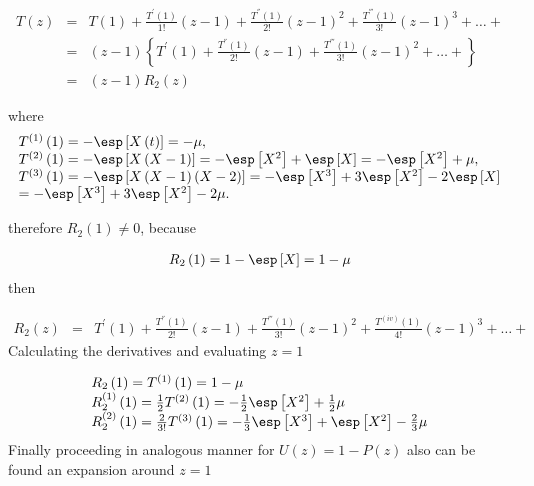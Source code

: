 \begin{eqnarray*}
T\left(z\right)&=&T\left(1\right)+\frac{T^{'}\left(1\right)}{1!}\left(z-1\right)+\frac{T^{''}\left(1\right)}{2!}\left(z-1\right)^{2}+\frac{T^{'''}\left(1\right)}{3!}\left(z-1\right)^{3}+\ldots+\\
&=&\left(z-1\right)\left\{T^{'}\left(1\right)+\frac{T^{''}\left(1\right)}{2!}\left(z-1\right)+\frac{T^{'''}\left(1\right)}{3!}\left(z-1\right)^{2}+\ldots+\right\}\\
&=&\left(z-1\right)R_{2}\left(z\right)
\end{eqnarray*}

where
\begin{eqnarray}
\begin{array}{l}
T^{(1)}\left(1\right)=-\esp\left[X\left(t\right)\right]=-\mu,\\ T^{(2)}\left(1\right)=-\esp\left[X\left(X-1\right)\right]
=-\esp\left[X^{2}\right]+\esp\left[X\right]=-\esp\left[X^{2}\right]+\mu,\\
T^{(3)}\left(1\right)=-\esp\left[X\left(X-1\right)\left(X-2\right)\right]
=-\esp\left[X^{3}\right]+3\esp\left[X^{2}\right]-2\esp\left[X\right]\\
=-\esp\left[X^{3}\right]+3\esp\left[X^{2}\right]-2\mu.
\end{array}
\end{eqnarray}

therefore $R_{2}\left(1\right)\neq0$, because

\begin{eqnarray}\label{Eq.R2}
R_{2}\left(1\right)=1-\esp\left[X\right]=1-\mu
\end{eqnarray}
then 

\begin{eqnarray}
R_{2}\left(z\right)&=&T^{'}\left(1\right)+\frac{T^{''}\left(1\right)}{2!}\left(z-1\right)+\frac{T^{'''}\left(1\right)}{3!}\left(z-1\right)^{2}+\frac{T^{(iv)}\left(1\right)}{4!}\left(z-1\right)^{3}+\ldots+
\end{eqnarray}
Calculating the derivatives and evaluating $z=1$

\begin{eqnarray}
\begin{array}{l}
R_{2}\left(1\right)=T^{(1)}\left(1\right)=1-\mu\\
R_{2}^{(1)}\left(1\right)=\frac{1}{2}T^{(2)}\left(1\right)=-\frac{1}{2}\esp\left[X^{2}\right]+\frac{1}{2}\mu\\
R_{2}^{(2)}\left(1\right)=\frac{2}{3!}T^{(3)}\left(1\right)
=-\frac{1}{3}\esp\left[X^{3}\right]+\esp\left[X^{2}\right]-\frac{2}{3}\mu
\end{array}
\end{eqnarray}
Finally proceeding in analogous manner for $U\left(z\right)=1-P\left(z\right)$ also can be found an expansion around $z=1$

